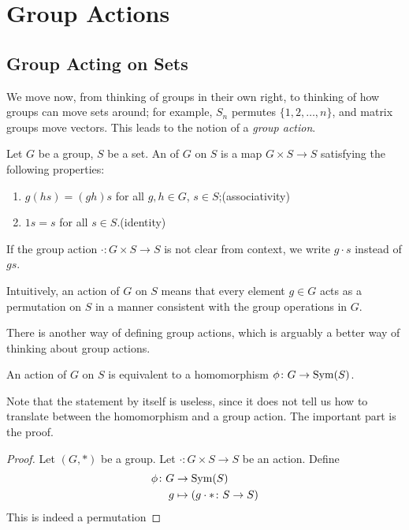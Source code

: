 \section{Group Actions}
\subsection{Group Acting on Sets}
We move now, from thinking of groups in their own right, to thinking of how groups can move sets around; for example, $S_n$ permutes $\{1,2,\dots,n\}$, and matrix groups move vectors.
This leads to the notion of a \emph{group action}.

\begin{definition}
Let $G$ be a group, $S$ be a set. An  of $G$ on $S$ is a map $G\times S\to S$ satisfying the following properties:
\begin{enumerate}[label=(\roman*)]
\item $g(hs)=(gh)s$ for all $g,h\in G$, $s\in S$;\hfill(associativity)
\item $1s=s$ for all $s\in S$.\hfill(identity)
\end{enumerate}
\end{definition}

\begin{notation}
If the group action $\cdot\colon G\times S\to S$ is not clear from context, we write $g\cdot s$ instead of $gs$.
\end{notation}

Intuitively, an action of $G$ on $S$ means that every element $g\in G$ acts as a permutation on $S$ in a manner consistent with the group operations in $G$.

There is another way of defining group actions, which is arguably a better way of thinking about group actions.

\begin{lemma}
An action of $G$ on $S$ is equivalent to a homomorphism $\phi\colon G\to\operatorname{Sym}(S)$.
\end{lemma}

Note that the statement by itself is useless, since it does not tell us how to translate between the homomorphism and a group action. The important part is the proof.

\begin{proof}
Let $(G,\ast)$ be a group.
Let $\cdot\colon G\times S\to S$ be an action. Define
\begin{align*}
\phi\colon G&\to\operatorname{Sym}(S)\\
g&\mapsto(g\cdot\ast\colon S\to S)
\end{align*}
This is indeed a permutation
\end{proof}


